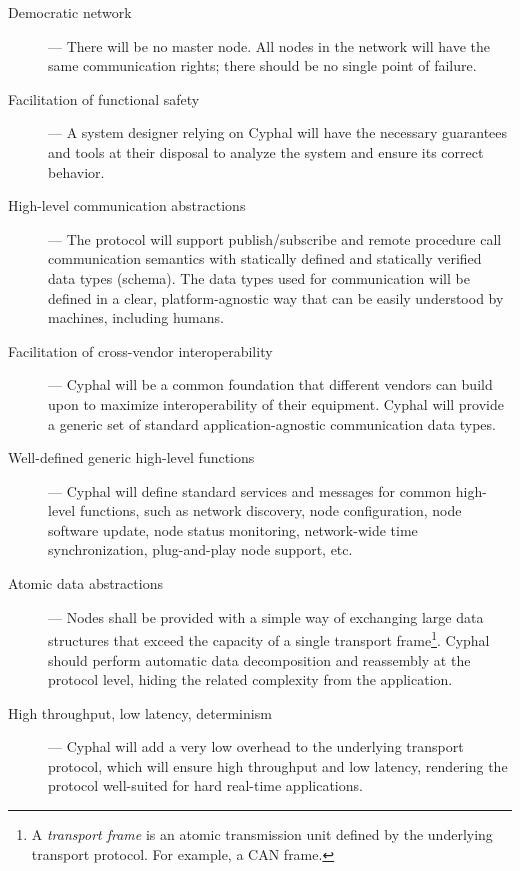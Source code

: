 \begin{description}
    \item[Democratic network] --- There will be no master node.
    All nodes in the network will have the same communication rights; there should be no single point of failure.

    \item[Facilitation of functional safety] --- A system designer relying on Cyphal will have the necessary
    guarantees and tools at their disposal to analyze the system and ensure its correct behavior.

    \item[High-level communication abstractions] --- The protocol will support publish/subscribe and remote procedure
    call communication semantics with statically defined and statically verified data types (schema).
    The data types used for communication will be defined in a clear, platform-agnostic way
    that can be easily understood by machines, including humans.  %

    \item[Facilitation of cross-vendor interoperability] --- Cyphal will be a common foundation that
    different vendors can build upon to maximize interoperability of their equipment.
    Cyphal will provide a generic set of standard application-agnostic communication data types.

    \item[Well-defined generic high-level functions] --- Cyphal will define standard services
    and messages for common high-level functions, such as network discovery, node configuration,
    node software update, node status monitoring, network-wide time synchronization, plug-and-play node support, etc.

    \item[Atomic data abstractions] --- Nodes shall be provided with a simple way of exchanging large
    data structures that exceed the capacity of a single transport frame\footnote{%
        A \emph{transport frame} is an atomic transmission unit defined by the underlying transport protocol.
        For example, a CAN frame.
    }.
    Cyphal should perform automatic data decomposition and reassembly at the protocol level,
    hiding the related complexity from the application.

    \item[High throughput, low latency, determinism] --- Cyphal will add a very low overhead to the underlying
    transport protocol, which will ensure high throughput and low latency, rendering the protocol well-suited
    for hard real-time applications.


\end{description}
